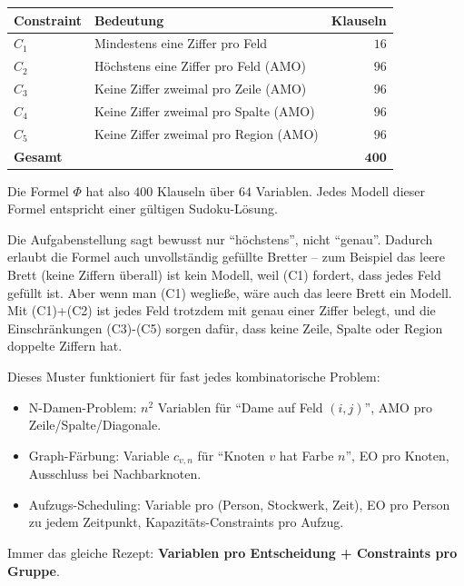 \documentclass[a4paper,12pt]{article}
\begin{document}
\begin{center}
\renewcommand{\arraystretch}{1.3}
\begin{tabular}{l|l|r}
\toprule
\textbf{Constraint} & \textbf{Bedeutung} & \textbf{Klauseln} \\
\midrule
$C_1$ & Mindestens eine Ziffer pro Feld & $16$ \\
$C_2$ & H\"ochstens eine Ziffer pro Feld (AMO) & $96$ \\
$C_3$ & Keine Ziffer zweimal pro Zeile (AMO) & $96$ \\
$C_4$ & Keine Ziffer zweimal pro Spalte (AMO) & $96$ \\
$C_5$ & Keine Ziffer zweimal pro Region (AMO) & $96$ \\
\midrule
\textbf{Gesamt} & & $\mathbf{400}$ \\
\bottomrule
\end{tabular}
\end{center}

Die Formel $\Phi$ hat also $400$ Klauseln \"uber $64$ Variablen. Jedes
Modell dieser Formel entspricht einer g\"ultigen Sudoku-L\"osung.

\begin{merkbox}[title={Warum "`h\"ochstens"' statt "`genau"'?}]
Die Aufgabenstellung sagt bewusst nur "`h\"ochstens"', nicht
"`genau"'. Dadurch erlaubt die Formel auch unvollst\"andig gef\"ullte
Bretter -- zum Beispiel das leere Brett (keine Ziffern \"uberall) ist
kein Modell, weil (C1) fordert, dass jedes Feld gef\"ullt ist. Aber
wenn man (C1) weglie{\ss}e, w\"are auch das leere Brett ein Modell.
Mit (C1)+(C2) ist jedes Feld trotzdem mit genau einer Ziffer belegt,
und die Einschr\"ankungen (C3)-(C5) sorgen daf\"ur, dass keine Zeile,
Spalte oder Region doppelte Ziffern hat.
\end{merkbox}

\begin{merkbox}[title={Goldene Regel des Encodings}]
Dieses Muster funktioniert f\"ur fast jedes kombinatorische Problem:
\begin{itemize}[nosep]
\item N-Damen-Problem: $n^2$ Variablen f\"ur "`Dame auf Feld $(i,j)$"',
      AMO pro Zeile/Spalte/Diagonale.
\item Graph-F\"arbung: Variable $c_{v,n}$ f\"ur "`Knoten $v$ hat Farbe
      $n$"', EO pro Knoten, Ausschluss bei Nachbarknoten.
\item Aufzugs-Scheduling: Variable pro (Person, Stockwerk, Zeit), EO
      pro Person zu jedem Zeitpunkt, Kapazit\"ats-Constraints pro
      Aufzug.
\end{itemize}
Immer das gleiche Rezept: \textbf{Variablen pro Entscheidung +
Constraints pro Gruppe}.
\end{merkbox}
\end{document}
